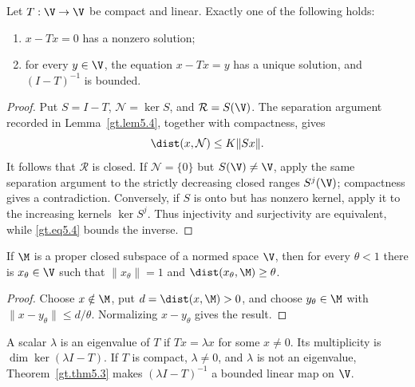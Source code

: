\begin{theorem}\label{gt.thm5.3}
Let $T:\V\to\V$ be compact and linear. Exactly one of the following holds:
\begin{enumerate}
\item $x-Tx=0$ has a nonzero solution;
\item for every $y\in\V$, the equation $x-Tx=y$ has a unique solution, and
$(I-T)^{-1}$ is bounded.
\end{enumerate}
\end{theorem}
\begin{proof}
\sketch Put $S=I-T$, $\mathcal N=\ker S$, and $\mathcal R=S(\V)$. The
separation argument recorded in Lemma~\ref{gt.lem5.4}, together with
compactness, gives
\begin{equation}\label{gt.eq5.4}
\dist(x,\mathcal N)\leq K\|Sx\|.
\end{equation}
It follows that $\mathcal R$ is closed. If $\mathcal N=\{0\}$ but
$S(\V)\neq\V$, apply the same separation argument to the strictly decreasing
closed ranges $S^j(\V)$; compactness gives a contradiction. Conversely, if
$S$ is onto but has nonzero kernel, apply it to the increasing kernels
$\ker S^j$. Thus injectivity and surjectivity are equivalent, while
\eqref{gt.eq5.4} bounds the inverse.
\end{proof}

\begin{lemma}\label{gt.lem5.4}
If $\M$ is a proper closed subspace of a normed space $\V$, then for every
$\theta<1$ there is $x_\theta\in\V$ such that
$\|x_\theta\|=1$ and $\dist(x_\theta,\M)\geq\theta$.
\end{lemma}
\begin{proof}
\sketch Choose $x\notin\M$, put $d=\dist(x,\M)>0$, and choose
$y_\theta\in\M$ with $\|x-y_\theta\|\leq d/\theta$. Normalizing
$x-y_\theta$ gives the result.
\end{proof}

\begin{definition}\label{gt.def5.3.eigenvalue}
A scalar $\lambda$ is an eigenvalue of $T$ if $Tx=\lambda x$ for some
$x\neq0$. Its multiplicity is $\dim\ker(\lambda I-T)$. If $T$ is compact,
$\lambda\neq0$, and $\lambda$ is not an eigenvalue, Theorem~\ref{gt.thm5.3}
makes $(\lambda I-T)^{-1}$ a bounded linear map on $\V$.
\end{definition}

